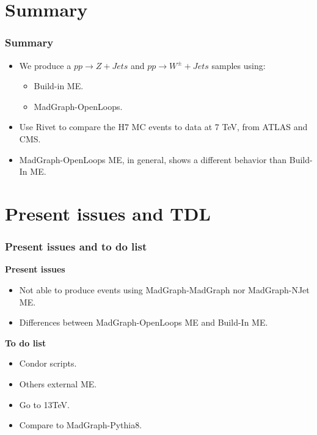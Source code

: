 \documentclass{beamer}
\numberwithin{figure}{section}
\begin{document}
\section{Summary}
\begin{frame}
 \frametitle{Summary}
    \begin{itemize}
        \item We produce a $pp \rightarrow Z+Jets$ and $pp \rightarrow W^\pm +Jets$ samples using:
        \begin{itemize}
            \item Build-in ME.
            \item MadGraph-OpenLoops.
        \end{itemize}
    
    \item Use Rivet to compare the H7 MC events to data at 7 TeV, from ATLAS and CMS.
    \item MadGraph-OpenLoops ME, in general, shows a different behavior than Build-In ME.
    
    \end{itemize}
    
    
    
\end{frame}

\section{Present issues  and TDL}
\begin{frame}
 \frametitle{Present issues and to do list}
 \textbf{Present issues}
 
 \begin{itemize}
    \item Not able to produce events using MadGraph-MadGraph nor MadGraph-NJet ME.
    \item Differences between MadGraph-OpenLoops ME and Build-In ME.
  \end{itemize}
  
 \textbf{To do list}
    \begin{itemize}
        \item Condor scripts.
        \item Others external ME.
        \item Go to 13TeV.
        \item Compare to MadGraph-Pythia8.
 \end{itemize}


\end{frame}
\end{document}
